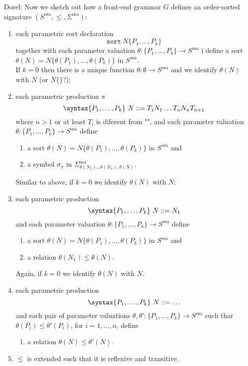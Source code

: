 \documentclass{article}
\newcommand\comment[2]{\par\noindent\color{red}#1: #2\color{black}\par\noindent}
\newcommand\dl{\comment{Dorel}}
\theoremstyle{definition}
\theoremstyle{definition}
\theoremstyle{definition}
\theoremstyle{theorem}
\theoremstyle{theorem}
\theoremstyle{theorem}
\newcommand{\sort}{\texttt{sort}}
\begin{document}
\dl{
Now we sketch out how a front-end grammar $G$ defines an order-sorted signature $(S^\textrm{osa},\le, \Sigma^\textrm{osa})$:
\begin{enumerate}
\item each parametric sort declaration
\[\sort\ N\{P_1,\ldots,P_k\}\]
together with each parameter valuation $\theta : \{P_1,\ldots,P_k\}\to S^\textrm{osa}$ i
define a sort $\theta(N)=N\{\theta(P_1),\ldots,\theta(P_k)\}$ in $S^\textrm{osa}$.
\\
If $k=0$ then there is a unique function  $\theta : \emptyset\to S^\textrm{osa}$ and we identify $\theta(N)$ with $N$ (or $N\{\}$?);
\item each parametric production $\pi$
\[\syntax\{P_1,\ldots,P_k\}\ N ::= T_1 N_1 \ldots T_n N_n T_{n+1}\]
where $n>1$ or at least $T_i$ is diferent from "", and each parameter valuation
$\theta : \{P_1,\ldots,P_k\}\to S^\textrm{osa}$ define
\begin{enumerate}
\item a sort $\theta(N)=N\{\theta(P_1),\ldots,\theta(P_k)\}$ in $S^\textrm{osa}$ and
\item a symbol $\sigma_\pi$ in $\Sigma^\textrm{osa}_{\theta(N_1)\ldots\theta(N_n),\theta(N)}$.
\end{enumerate}
Similar to above, if $k=0$ we identify $\theta(N)$ with $N$;
\item each parametric production
\[\syntax\{P_1,\ldots,P_k\}\ N ::= N_1\]
and each parameter valuation $\theta : \{P_1,\ldots,P_k\}\to S^\textrm{osa}$ define
\begin{enumerate}
\item a sort $\theta(N)=N\{\theta(P_1),\ldots,\theta(P_k)\}$ in $S^\textrm{osa}$ and
\item a relation $\theta(N_1)\le \theta(N)$.
\end{enumerate}
Again, if $k=0$ we identify $\theta(N)$ with $N$.
 \item each parametric production
\[\syntax\{P_1,\ldots,P_k\}\ N ::= \ldots\]
and each pair of parameter valuations $\theta,\theta' : \{P_1,\ldots,P_k\}\to S^\textrm{osa}$ such thar $\theta(P_i)\le \theta'(P_i)$, for $i=1,\ldots,n$, define
\begin{enumerate}
\item a relation $\theta(N)\le \theta'(N)$.
\end{enumerate}
\item $\le$ is extended such that it is reflexive and transitive.
\end{enumerate}

}
\end{document}
